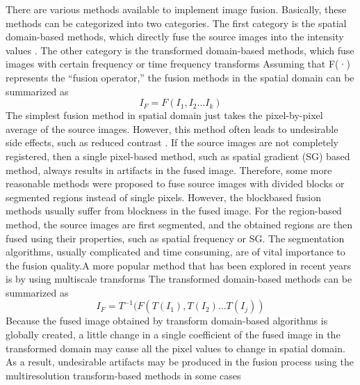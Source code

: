 There are various methods available to implement image
fusion. Basically, these methods can be categorized into two
categories. The first category is the spatial domain-based methods, which directly fuse the source images into the intensity
values . The other category is the transformed domain-based methods, which fuse images with certain frequency or time frequency transforms Assuming that F(·) represents the “fusion operator,” the fusion methods in the spatial domain can be summarized as 
\begin{equation}
 {I}_{F}= F({I}_{1},{I}_{2} \dots{} {I}_{k})
\end{equation}
The simplest fusion method in spatial domain just takes
the pixel-by-pixel average of the source images. However, this
method often leads to undesirable side effects, such as reduced
contrast . If the source images are not completely registered,
then a single pixel-based method, such as spatial gradient (SG) based method, always results in artifacts in the fused
image. Therefore, some more reasonable methods were proposed to fuse source images with divided blocks or segmented
regions instead of single pixels. However, the blockbased fusion methods usually suffer from blockness in the fused image. For the region-based method, the source images are first segmented, and the obtained regions are then fused using their properties, such as spatial frequency or SG. The segmentation algorithms, usually complicated and time consuming, are of vital importance to the fusion quality.A more popular method that has been explored in recent years is by using multiscale transforms The transformed domain-based methods can be summarized as
\begin{equation}
{I}_{F}={T}^{-1}(F(T({I}_{1}),T({I}_{2})\dots{} T({I}_{j}))
\end{equation}
\hfill \break
 Because the fused image obtained by transform domain-based algorithms is globally created, a little change in a single coefficient of the fused image in the transformed domain may cause all the pixel values to change in spatial domain. As a result, undesirable artifacts may be produced in the fusion process using the multiresolution transform-based methods in some cases
